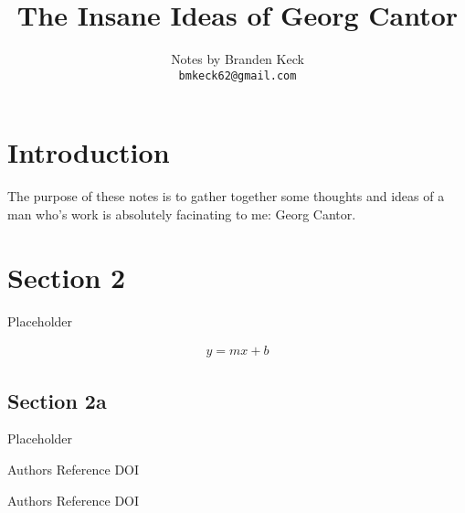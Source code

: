 \documentclass{article}
\title{The Insane Ideas of Georg Cantor}
\author{
  Notes by Branden Keck\\
  \texttt{bmkeck62@gmail.com} \\
}
\date{}
\begin{document}
\maketitle

\section{Introduction}
The purpose of these notes is to gather together some thoughts and ideas of a man who's work is absolutely facinating to me: Georg Cantor.

\section{Section 2}

Placeholder

\begin{gather*}
y = mx + b
\end{gather*}

\subsection{Section 2a}

Placeholder

\begin{thebibliography}{1}

Authors
\newblock Reference
\newblock DOI

Authors
\newblock Reference
\newblock DOI

\end{thebibliography}
\end{document}
